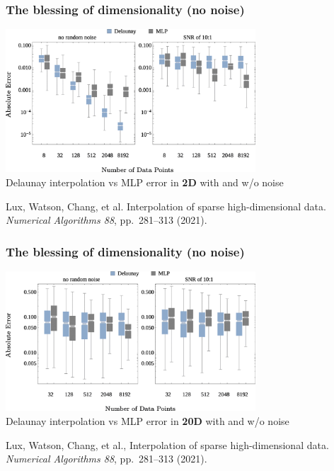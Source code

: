 \documentclass[aspectratio=169]{beamer}
\begin{document}
\begin{frame}
\frametitle{The blessing of dimensionality (no noise)}

\begin{center}
\includegraphics[width=0.7\textwidth]{../img/delaunay_new/2d_errors_w_noise.png}\\
Delaunay interpolation vs MLP error in {\bf 2D} with and w/o noise
\end{center}

\vfill

{\tiny Lux, Watson, Chang, et al.
Interpolation of sparse high-dimensional data.
{\sl Numerical Algorithms 88}, pp.~281–313 (2021).}

\end{frame}

\begin{frame}
\frametitle{The blessing of dimensionality (no noise)}

\begin{center}
\includegraphics[width=0.7\textwidth]{../img/delaunay_new/20d_errors_w_noise.png}\\
Delaunay interpolation vs MLP error in {\bf 20D} with and w/o noise
\end{center}

\vfill

{\tiny Lux, Watson, Chang, et al.,
Interpolation of sparse high-dimensional data.
{\sl Numerical Algorithms 88}, pp.~281–313 (2021).}

\end{frame}
\end{document}
